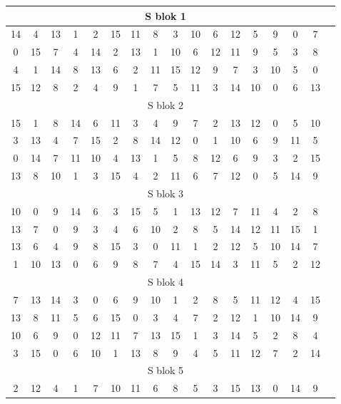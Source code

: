 \documentclass[12p]{article}
\begin{document}
\begin{table}[H]
\centering
\begin{adjustbox}{width=0.8\textwidth}
\begin{tabular}{|c|c|c|c|c|c|c|c|c|c|c|c|c|c|c|c|c|}
\hline
\multicolumn{16}{|c|}{S blok 1}\\ 
\hline
14&4&13&1&2&15&11&8&3&10&6&12&5&9&0&7 \\ \hline
0 &	15& 	7 &	4 &	14 &	2& 	13& 	1 &	10 &	6 &	12 &	11 &	9 &	5 &	3 &	8 \\ \hline
4 &	1 &	14 &	8 	&13 	&6 &	2& 	11& 	15& 	12 &	9 	&7& 	3& 	10& 	5& 	0 \\ \hline
15 &	12& 	8 &	2 &	4 &	9 &	1 &	7 &	5 &	11 &	3 &	14 &	10 &	0 &	6 &	13 \\ \hline
\multicolumn{16}{|c|}{S blok 2} \\ \hline
15 &	1 &	8 &	14 &	6 &	11 &	3 &	4 &	9 &	7 &	2 &	13 &	12 &	0 &	5 &	10 \\ \hline
3 &	13& 	4 &	7 &	15 &	2 &	8 &	14 &	12 &	0 &	1 &	10 &	6 &	9 &	11 &	5 \\ \hline
0 &	14 &	7 &	11 &	10 &	4 &	13 &	1 &	5 &	8 &	12 &	6 &	9 &	3 &	2 &	15 \\ \hline
13 &	8 &	10 &	1 &	3 &	15 &	4 &	2 &	11 &	6 &	7 &	12 &	0 &	5 &	14 &	9 \\ \hline
\multicolumn{16}{|c|}{S blok 3}\\ \hline
10 &	0 &	9 &	14 &	6 &	3 &	15 &	5 &	1 &	13 &	12 &	7 &	11 &	4 &	2 &	8\\ \hline
13 &	7 &	0 &	9 &	3 &	4 &	6 &	10 &	2 &	8 &	5 &	14 &	12 &	11 &	15 &	1\\ \hline
13 &	6 &	4 &	9 &	8 &	15 &	3 &	0 &	11 &	1 &	2 &	12 &	5 &	10 &	14 &	7\\ \hline
1 &	10 &	13 &	0 &	6 &	9 &	8 &	7 &	4 &	15 &	14 &	3 &	11 &	5 &	2 &	12 \\ \hline
\multicolumn{16}{|c|}{S blok 4}\\ \hline
7 &	13 &	14 &	3 &	0 &	6 &	9 &	10 &	1 &	2& 	8& 	5& 	11& 	12& 	4& 	15\\ \hline
13& 	8& 	11& 	5& 	6& 	15& 	0& 	3& 	4& 	7& 	2& 	12& 	1& 	10& 	14& 	9\\ \hline
10& 	6& 	9& 	0& 	12& 	11& 	7& 	13& 	15& 	1& 	3& 	14& 	5& 	2& 	8& 	4\\ \hline
3& 	15& 	0& 	6& 	10& 	1& 	13& 	8& 	9& 	4& 	5& 	11& 	12& 	7& 	2& 	14\\ \hline
\multicolumn{16}{|c|}{S blok 5}\\ \hline
2& 	12& 	4& 	1& 	7& 	10& 	11& 	6& 	8& 	5& 	3& 	15& 	13& 	0& 	14& 	9\\ \hline

\end{tabular}
\end{adjustbox}
\end{table}
\end{document}
